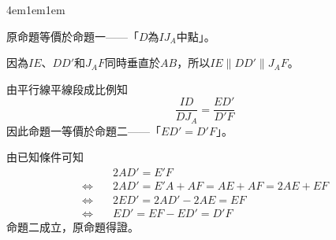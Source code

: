 \documentclass[12pt]{article}
\begin{document}
\begin{mybox}[解答]{4em}{1em}{1em}
\begin{enumerate}[label = 方法 \arabic*：]
        原命題等價於命題一——「$D$為$IJ_A$中點」。

        因為$IE$、$DD'$和$J_AF$同時垂直於$AB$，所以$IE\parallel DD'\parallel J_AF$。

        由平行線平線段成比例知
        $$
            \frac{ID}{DJ_A}=\frac{ED'}{D'F}
        $$
        因此命題一等價於命題二——「$ED'=D'F$」。

        由已知條件可知
        \begin{align*}
            &2AD'=E'F\\
            \Leftrightarrow\quad& 2AD'=E'A+AF=AE+AF=2AE+EF\\
            \Leftrightarrow\quad& 2ED'=2AD'-2AE=EF\\
            \Leftrightarrow\quad& ED'=EF-ED'=D'F
        \end{align*}
        命題二成立，原命題得證。
    \end{enumerate}
\end{mybox}
\end{document}
